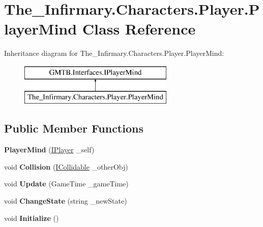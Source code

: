 \hypertarget{class_the___infirmary_1_1_characters_1_1_player_1_1_player_mind}{}\section{The\+\_\+\+Infirmary.\+Characters.\+Player.\+Player\+Mind Class Reference}
\label{class_the___infirmary_1_1_characters_1_1_player_1_1_player_mind}
Inheritance diagram for The\+\_\+\+Infirmary.\+Characters.\+Player.\+Player\+Mind\+:\begin{figure}[H]
\begin{center}
\leavevmode
\includegraphics[height=2.000000cm]{class_the___infirmary_1_1_characters_1_1_player_1_1_player_mind}
\end{center}
\end{figure}
\subsection*{Public Member Functions}
\begin{DoxyCompactItemize}
\item 
\mbox{\label{class_the___infirmary_1_1_characters_1_1_player_1_1_player_mind_a538e3d93dd0e1550e0a436ff0bd603dd}} 
{\bfseries Player\+Mind} (\mbox{\hyperlink{interface_g_m_t_b_1_1_interfaces_1_1_i_player}{I\+Player}} \+\_\+self)
\item 
\mbox{\label{class_the___infirmary_1_1_characters_1_1_player_1_1_player_mind_a4271243d06b2bb4be4bd29c6e18a3f12}} 
void {\bfseries Collision} (\mbox{\hyperlink{interface_g_m_t_b_1_1_collision_system_1_1_i_collidable}{I\+Collidable}} \+\_\+other\+Obj)
\item 
\mbox{\label{class_the___infirmary_1_1_characters_1_1_player_1_1_player_mind_a35cd0fe1baa0fd67adfe8c438983092f}} 
void {\bfseries Update} (Game\+Time \+\_\+game\+Time)
\item 
\mbox{\label{class_the___infirmary_1_1_characters_1_1_player_1_1_player_mind_a6d2cba84a51ba1979b3f3e2b8afbbc41}} 
void {\bfseries Change\+State} (string \+\_\+new\+State)
\item 
\mbox{\label{class_the___infirmary_1_1_characters_1_1_player_1_1_player_mind_ad28d2f30589641598240654fe38bc892}} 
void {\bfseries Initialize} ()
\end{DoxyCompactItemize}
